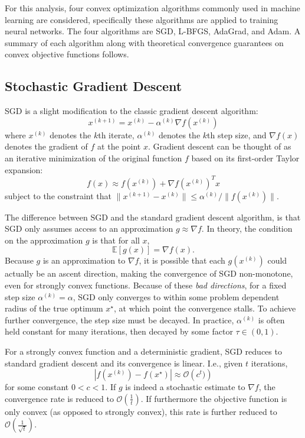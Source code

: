 \documentclass[letterpaper, 10 pt, conference]{IEEEtran}  %
\begin{document}
For this analysis, four convex optimization algorithms commonly used
in machine learning are considered, specifically these algorithms are
applied to training neural networks. The four algorithms are SGD,
L-BFGS, AdaGrad, and Adam. A summary of each algorithm along with
theoretical convergence guarantees on convex objective functions
follows.

\subsection{Stochastic Gradient Descent}

SGD \cite{nemirovski2009robust} is a slight modification to the classic
gradient descent algorithm:
$$ x^{(k+1)} = x^{(k)} - \alpha^{(k)} \nabla f\left(x^{(k)}\right) $$
where $x^{(k)}$ denotes the $k$th iterate, $\alpha^{(k)}$ denotes the
$k$th step size, and $\nabla f(x)$ denotes the gradient of $f$ at the
point $x$.  Gradient descent can be thought of as an iterative
minimization of the original function $f$ based on its first-order
Taylor expansion:
$$ f(x) \approx f(x^{(k)}) + \nabla f(x^{(k)})^T x $$
subject to the constraint that $\|x^{(k+1)} - x^{(k)}\| \leq
\alpha^{(k)}/\| f(x^{(k)})\|$.

The difference between SGD and the standard gradient descent
algorithm, is that SGD only assumes access to an approximation $g
\approx \nabla f$.  In theory, the condition on the approximation $g$
is that for all $x$,
$$ \mathbb{E}[g(x)] = \nabla f(x). $$
Because $g$ is an approximation to $\nabla f$, it is possible that
each $g(x^{(k)})$ could actually be an ascent direction, making the
convergence of SGD non-monotone, even for strongly convex functions.
Because of these \textit{bad directions}, for a fixed step size
$\alpha^{(k)} = \alpha$, SGD only converges to within some problem
dependent radius of the true optimum $x^\star$, at which point the
convergence stalls.  To achieve further convergence, the step size
must be decayed.  In practice, $\alpha^{(k)}$ is often held constant
for many iterations, then decayed by some factor $\tau \in (0,1)$.

For a strongly convex function and a deterministic gradient, SGD
reduces to standard gradient descent and its convergence is linear.
I.e., given $t$ iterations,
$$ |f(x^{(k)}) - f(x^\star)| \approx \mathcal{O}\left( c^t ) \right) $$
for some constant $0 < c < 1$.  If $g$ is indeed a stochastic estimate
to $\nabla f$, the convergence rate is reduced to
$\mathcal{O}\left(\frac{1}{t}\right)$.  If furthermore the objective
function is only convex (as opposed to strongly convex), this rate is
further reduced to $\mathcal{O}\left(\frac{1}{\sqrt{t}}\right)$.
\end{document}
